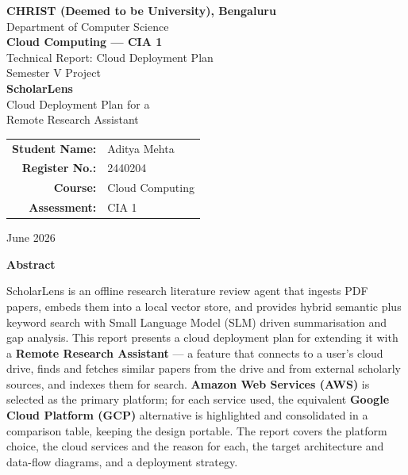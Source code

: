 \documentclass[12pt,a4paper]{article}
\begin{document}
\begin{titlepage}
    \centering
    \vspace*{0.5cm}

    {\large\bfseries CHRIST (Deemed to be University), Bengaluru}\\[4pt]
    {\normalsize Department of Computer Science}\\[1.5cm]

    {\LARGE\bfseries Cloud Computing --- CIA 1}\\[0.4cm]
    {\large Technical Report: Cloud Deployment Plan}\\[0.3cm]
    {\large Semester V Project}\\[1.8cm]

    {\huge\bfseries ScholarLens}\\[0.3cm]
    {\Large Cloud Deployment Plan for a\\ Remote Research Assistant}\\[2.2cm]

    \begin{tabular}{>{\bfseries}r l}
        Student Name: & Aditya Mehta \\[6pt]
        Register No.: & 2440204 \\[6pt]
        Course: & Cloud Computing \\[6pt]
        Assessment: & CIA 1 \\[6pt]
    \end{tabular}

    \vfill
    {\large June 2026}
\end{titlepage}

\begin{center}
    {\Large\bfseries Abstract}
\end{center}

\vspace{0.2cm}

ScholarLens is an offline research literature review agent that ingests PDF
papers, embeds them into a local vector store, and provides hybrid semantic
plus keyword search with Small Language Model (SLM) driven summarisation and
gap analysis. This report presents a cloud deployment plan for extending it
with a \textbf{Remote Research Assistant} --- a feature that connects to a
user's cloud drive, finds and fetches similar papers from the drive and from
external scholarly sources, and indexes them for search. \textbf{Amazon Web
Services (AWS)} is selected as the primary platform; for each service used, the
equivalent \textbf{Google Cloud Platform (GCP)} alternative is highlighted and
consolidated in a comparison table, keeping the design portable. The report
covers the platform choice, the cloud services and the reason for each, the
target architecture and data-flow diagrams, and a deployment strategy.
\end{document}
